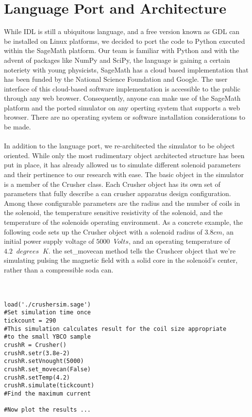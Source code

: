 \documentclass[prb,preprint]{revtex4-1}
\begin{document}
\section{Language Port and Architecture}
While IDL is still a ubiquitous language, and a free version known as GDL can be installed on Linux platforms, we decided to port the code to Python executed within the SageMath platform.  Our team is familiar with Python and with the advent of packages like NumPy and SciPy, the language is gaining a certain noteriety with young physicists, SageMath has a cloud based implementation that has been funded by the National Science Foundation and Google. The user interface of this cloud-based software implementation is  accessible to the public through any web browser.  Consequently, anyone can make use of the SageMath platform and the ported simulator on any operting system that supports a web browser.  There are no operating system or software installation considerations to be made.
\\
\\
In addition to the language port, we re-architected the simulator to be object oriented.  While only the most rudimentary object architected structure has been put in place, it has already allowed us to simulate different solenoid parameters and their pertinence to our research with ease.  The basic object in the simulator is a member of the Crusher class.  Each Crusher object has its own set of parameters that fully describe a can crusher apparatus design configuration.  Among these configurable parameters  are the radius and the number of coils in the solenoid, the temperature sensitive resistivity of the solenoid, and the temperature of the solenoids operating environment.  As a concrete example, the following code sets up the Crusher object with a solenoid radius of $3.8 cm$, an initial power supply voltage of $5000\;\;Volts$, and an operating temperature of $4.2\;\;degrees\;\;K$.  the set\_movecan method tells the Crushcer object that we're simulating pulsing the magnetic field with a solid core in the solenoid's center, rather than a compressible soda can.
\\\\\\
\lstset{language=Python}
\begin{lstlisting}[frame=single]
load('./crushersim.sage')
#Set simulation time once
tickcount = 290
#This simulation calculates result for the coil size appropriate
#to the small YBCO sample
crushR = Crusher()
crushR.setr(3.8e-2)
crushR.setVnought(5000)
crushR.set_movecan(False)
crushR.setTemp(4.2)
crushR.simulate(tickcount)
#Find the maximum current

#Now plot the results ...
\end{lstlisting}
\end{document}
